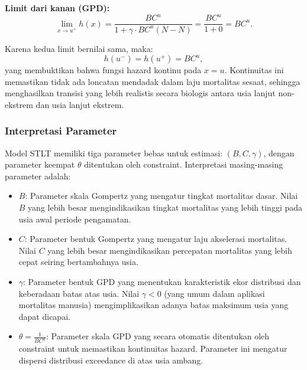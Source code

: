 \textbf{Limit dari kanan (GPD):}
\begin{equation}
\lim_{x \to u^+} h(x) = \frac{BC^u}{1 + \gamma \cdot BC^u(N-N)} = \frac{BC^u}{1 + 0} = BC^u.
\label{eq:hazard_right_limit}
\end{equation}

Karena kedua limit bernilai sama, maka:
\begin{equation}
h(u^-) = h(u^+) = BC^u,
\label{eq:hazard_continuity}
\end{equation}
yang membuktikan bahwa fungsi hazard kontinu pada $x = u$. Kontinuitas ini memastikan tidak ada loncatan mendadak dalam laju mortalitas sesaat, sehingga menghasilkan transisi yang lebih realistis secara biologis antara usia lanjut non-ekstrem dan usia lanjut ekstrem.

\subsubsection{Interpretasi Parameter}

Model STLT memiliki tiga parameter bebas untuk estimasi: $(B, C, \gamma)$, dengan parameter keempat $\theta$ ditentukan oleh constraint. Interpretasi masing-masing parameter adalah:

\begin{itemize}
    \item \textbf{$B$}: Parameter skala Gompertz yang mengatur tingkat mortalitas dasar. Nilai $B$ yang lebih besar mengindikasikan tingkat mortalitas yang lebih tinggi pada usia awal periode pengamatan.
    
    \item \textbf{$C$}: Parameter bentuk Gompertz yang mengatur laju akselerasi mortalitas. Nilai $C$ yang lebih besar mengindikasikan percepatan mortalitas yang lebih cepat seiring bertambahnya usia.
    
    \item \textbf{$\gamma$}: Parameter bentuk GPD yang menentukan karakteristik ekor distribusi dan keberadaan batas atas usia. Nilai $\gamma < 0$ (yang umum dalam aplikasi mortalitas manusia) mengimplikasikan adanya batas maksimum usia yang dapat dicapai.
    
    \item \textbf{$\theta = \frac{1}{BC^u}$}: Parameter skala GPD yang secara otomatis ditentukan oleh constraint untuk memastikan kontinuitas hazard. Parameter ini mengatur dispersi distribusi exceedance di atas usia ambang.
\end{itemize}

